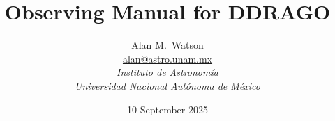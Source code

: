 \title{
\bfseries Observing Manual for DDRAGO
}

\author{
Alan M.\ Watson\\
\href{mailto:alan@astro.unam.mx}{alan@astro.unam.mx}\\[\medskipamount]
\itshape Instituto de Astronomía\\
\itshape Universidad Nacional Autónoma de México
}

\date{10 September 2025}

\maketitle

\tableofcontents